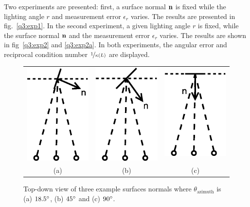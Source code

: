 \documentclass{report}
\begin{document}
Two experiments are presented: first, a surface normal $\mathbf{n}$ is fixed while the lighting angle $r$ and measurement error $\epsilon_r$ varies. The results are presented in fig.~\ref{q3:exp1}. In the second experiment, a given lighting angle $r$ is fixed, while the surface normal $\mathbf{n}$ and the measurement error $\epsilon_r$ varies. The results are shown in fig~\ref{q3:exp2} and \ref{q3:exp2a}. In both experiments, the angular error and reciprocal condition number $\nicefrac{1}{\kappa\left(L\right)}$ are displayed.

\begin{figure}
  \centering
  \begin{tabular}{ccc}
  \includegraphics[width=0.2\linewidth]{q3_surface_normal_18-5.eps} &
  \includegraphics[width=0.2\linewidth]{q3_surface_normal_45.eps} &
  \includegraphics[width=0.2\linewidth]{q3_surface_normal_90.eps} \\
  (a) & (b) & (c)
  \end{tabular}
  \caption[Surface normal examples]
   {Top-down view of three example surfaces normals where $\theta_{\text{azimuth}}$ is (a) $18.5\degree$, (b) $45\degree$ and (c) $90\degree$.}
  \label{q3:angle_setup}
\end{figure}
\end{document}
